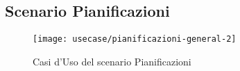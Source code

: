 \subsection{Scenario Pianificazioni}
\begin{figure}[H] 
    \texttt{[image: usecase/pianificazioni-general-2]} 
    \caption{Casi d'Uso del scenario Pianificazioni}
\end{figure}